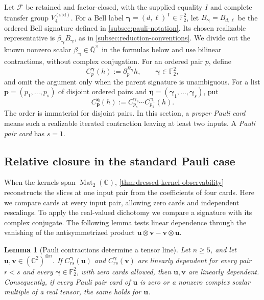 \documentclass[11pt,letterpaper,onecolumn]{article}
\theoremstyle{plain}
\newtheorem{lemma}[lemma]{Lemma}
\theoremstyle{definition}
\theoremstyle{remark}
\newcommand{\AlgNums}{\overline{\mathbb Q}}
\newcommand{\Ftwo}{\mathbb F_2}
\newcommand{\cF}{\mathcal F}
\newcommand{\KleinStd}{{V_4^{(\mathrm{std})}}}
\newcommand{\Mat}{\operatorname{Mat}}
\begin{document}
Let \(\cF\) be retained and factor-closed, with the supplied equality \(I\) and complete transfer group \(\KleinStd\). For a Bell label
\({\boldsymbol{\gamma}}=(d,\ell)^{\mathsf T}\in\Ftwo^2\), let \(B_{\boldsymbol{\gamma}}=B_{d,\ell}\) be the ordered
Bell signature defined in \cref{subsec:pauli-notation}.
Its chosen realizable representative is
\(\beta_{\boldsymbol{\gamma}}B_{\boldsymbol{\gamma}}\), as in
\cref{subsec:reduction-conventions}. We divide out the known nonzero
scalar \(\beta_{\boldsymbol{\gamma}}\in\AlgNums^\times\) in the formulas below and use
bilinear contractions, without complex conjugation.
For an ordered pair \(p\), define
\begin{equation*}
 C_p^{\boldsymbol{\gamma}}(h):=\partial_p^{B_{\boldsymbol{\gamma}}}h,
 \qquad {\boldsymbol{\gamma}}\in\Ftwo^2,
\end{equation*}
and omit the argument only when the parent signature is unambiguous.  For a
list \(\mathbf p=(p_1,\ldots,p_s)\) of disjoint ordered pairs and
\(\boldsymbol\eta=({\boldsymbol{\gamma}}_1,\ldots,{\boldsymbol{\gamma}}_s)\), put
\begin{equation*}
 C_{\mathbf p}^{\boldsymbol\eta}(h)
 :=C_{p_s}^{{\boldsymbol{\gamma}}_s}\cdots C_{p_1}^{{\boldsymbol{\gamma}}_1}(h).
\end{equation*}
The order is immaterial for disjoint pairs.  In this section, a
\emph{proper Pauli card}
means such a realizable iterated contraction leaving at least two inputs. A
\emph{Pauli pair card} has \(s=1\).

\subsection{Relative closure in the standard Pauli case}
\label{proofsubsec:v4-relative-implication}

When the kernels span \(\Mat_2(\mathbb C)\),
\cref{thm:dressed-kernel-observability} reconstructs the slices at one
input pair from the coefficients of four cards. Here we compare cards
at every input pair, allowing zero cards and independent rescalings.
To apply the real-valued dichotomy we compare a signature with its
complex conjugate. The following lemma tests linear dependence through
the vanishing of the antisymmetrized product
\({\mathbf{u}}\otimes{\mathbf{v}}-{\mathbf{v}}\otimes{\mathbf{u}}\).

\begin{lemma}[Pauli contractions determine a tensor line]
\label{lem:v4-pauli-projective-determination}
Let \(n\ge5\), and let \({\mathbf{u}},{\mathbf{v}}\in(\mathbb C^2)^{\otimes n}\).
If \(C_{rs}^{\boldsymbol{\gamma}}({\mathbf{u}})\) and \(C_{rs}^{\boldsymbol{\gamma}}({\mathbf{v}})\) are linearly dependent
for every pair \(r<s\) and every \({\boldsymbol{\gamma}}\in\Ftwo^2\), with zero
cards allowed, then \({\mathbf{u}},{\mathbf{v}}\) are linearly dependent.
Consequently, if every Pauli pair card of \({\mathbf{u}}\) is zero or a nonzero
complex scalar multiple of a real tensor, the same holds for \({\mathbf{u}}\).
\end{lemma}
\end{document}

